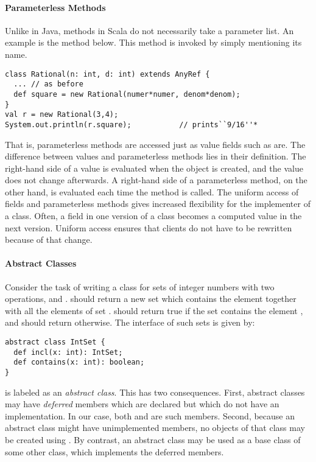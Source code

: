 \paragraph{Parameterless Methods}
Unlike in Java, methods in Scala do not necessarily take a
parameter list. An example is the  method below. This
method is invoked by simply mentioning its name. 
\begin{lstlisting}
class Rational(n: int, d: int) extends AnyRef {
  ... // as before
  def square = new Rational(numer*numer, denom*denom);
}
val r = new Rational(3,4);
System.out.println(r.square);           // prints``9/16''*
\end{lstlisting}
That is, parameterless methods are accessed just as value fields such
as  are. The difference between values and parameterless
methods lies in their definition. The right-hand side of a value is
evaluated when the object is created, and the value does not change
afterwards. A right-hand side of a parameterless method, on the other
hand, is evaluated each time the method is called.  The uniform access
of fields and parameterless methods gives increased flexibility for
the implementer of a class. Often, a field in one version of a class
becomes a computed value in the next version. Uniform access ensures
that clients do not have to be rewritten because of that change.

\paragraph{Abstract Classes}

Consider the task of writing a class for sets of integer numbers with
two operations,  and . 
should return a new set which contains the element  together
with all the elements of set .  should
return true if the set  contains the element , and
should return  otherwise. The interface of such sets is
given by:  
\begin{lstlisting}
abstract class IntSet {
  def incl(x: int): IntSet;
  def contains(x: int): boolean;
}
\end{lstlisting}
 is labeled as an \emph{abstract class}. This has two
consequences.  First, abstract classes may have {\em deferred} members
which are declared but which do not have an implementation. In our
case, both  and  are such members. Second,
because an abstract class might have unimplemented members, no objects
of that class may be created using . By contrast, an
abstract class may be used as a base class of some other class, which
implements the deferred members.

